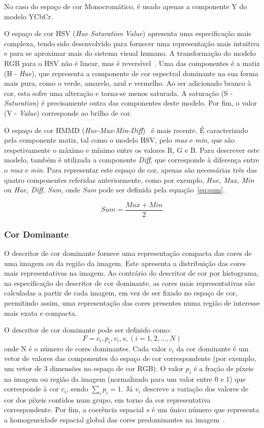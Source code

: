 No caso do espaço de cor Monocromático, é usado apenas a componente Y do modelo YCbCr. 

O espaço de cor HSV (\textit{Hue Saturation Value}) apresenta uma especificação mais complexa, tendo sido desenvolvido para fornecer uma representação mais intuitiva e para se aproximar mais do sistema visual humano. A transformação do modelo RGB para o HSV não é linear, mas é reversível~\cite{Manjunath2001}. Uma das componentes é a matiz (H - \textit{Hue}), que representa a componente de cor espectral dominante na sua forma mais pura, como o verde, amarelo, azul e vermelho. Ao ser adicionado branco à cor, esta sofre uma alteração e torna-se menos saturada. A saturação (S - \textit{Saturation}) é precisamente outra das componentes deste modelo. Por fim, o valor (V - \textit{Value}) corresponde ao brilho de cor.

O espaço de cor HMMD (\textit{Hue-Max-Min-Diff})~\cite{Manjunath2001, Ite-vil} é mais recente. É caracterizado pela componente matiz, tal como o modelo HSV, pelo \textit{max} e \textit{min}, que são respetivamente o máximo e mínimo entre os valores R, G e B. Para descrever este modelo, também é utilizada a componente \textit{Diff}, que corresponde à diferença entre o \textit{max} e \textit{min}. Para representar este espaço de cor, apenas são necessárias três das quatro componentes referidas anteriormente, como por exemplo, {\textit{Hue, Max, Min}} ou {\textit{Hue, Diff, Sum}}, onde \textit{Sum} pode ser definida pela equação~\ref{eq:sum}.

\begin{equation}
Sum = \frac{Max + Min}{2}
\label{eq:sum}
\end{equation}

\subsubsection{Cor Dominante}

O descritor de cor dominante fornece uma representação compacta das cores de uma imagem ou da região da imagem. Este apresenta a distribuição das cores mais representativas na imagem. Ao contrário do descritor de cor por histograma, na especificação do descritor de cor dominante, as cores mais representativas são calculadas a partir de cada imagem, em vez de ser fixado no espaço de cor, permitindo assim, uma representação das cores presentes numa região de interesse mais exata e compacta.

O descritor de cor dominante pode ser definido como:
\[ F = {{c_{i}, p_{i}, v_{i}},s}, (i=1,2,...,N) \]
onde N é o número de cores dominantes. Cada valor $ c_{i} $ da cor dominante é um vetor de valores das componentes do espaço de cor correspondente (por exemplo, um vetor de 3 dimensões no espaço de cor RGB). O valor $ p_{i} $ é a fração de píxeis na imagem ou região da imagem (normalizado para um valor entre 0 e 1) que corresponde à cor $ c_{i} $, sendo $  \sum_i p_{i} = 1 $. Já $ v_{i} $ descreve a variação dos valores de cor dos píxeis contidos num grupo, em torno da cor representativa correspondente. Por fim, a coerência espacial $ s $ é um único número que representa a homogeneidade espacial global das cores predominantes na imagem~\cite{Ite-vil}.

